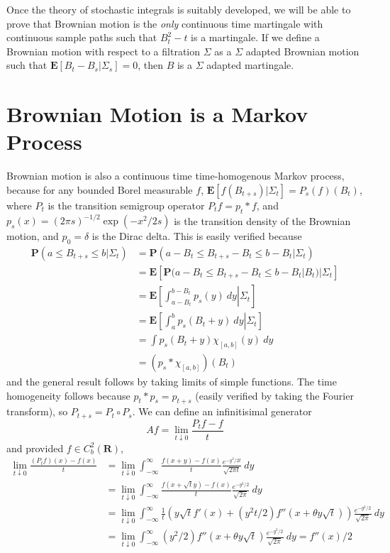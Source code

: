 Once the theory of stochastic integrals is suitably developed, we will be able to prove that Brownian motion is the {\it only} continuous time martingale with continuous sample paths such that $B_t^2 - t$ is a martingale. If we define a Brownian motion with respect to a filtration $\Sigma$ as a $\Sigma$ adapted Brownian motion such that $\mathbf{E}[B_t - B_s|\Sigma_s] = 0$, then $B$ is a $\Sigma$ adapted martingale.

\section{Brownian Motion is a Markov Process}

Brownian motion is also a continuous time time-homogenous Markov process, because for any bounded Borel measurable $f$, $\mathbf{E}[f(B_{t+s}) | \Sigma_t] = P_s(f)(B_t)$, where $P_t$ is the transition semigroup operator $P_t f = p_t * f$, and $p_s(x) = (2 \pi s)^{-1/2} \exp(-x^2/2s)$ is the transition density of the Brownian motion, and $p_0 = \delta$ is the Dirac delta. This is easily verified because
%
\begin{align*}
    \mathbf{P}(a \leq B_{t+s} \leq b | \Sigma_t) &= \mathbf{P}(a - B_t \leq B_{t+s} - B_t \leq b - B_t | \Sigma_t)\\
    &= \mathbf{E}[\mathbf{P}(a - B_t \leq B_{t+s} - B_t \leq b - B_t | B_t) | \Sigma_t]\\
    &= \mathbf{E} \left. \left[ \int_{a - B_t}^{b - B_t} p_s(y)\ dy \right| \Sigma_t \right]\\
    &= \mathbf{E} \left. \left[ \int_a^b p_s(B_t + y)\ dy \right| \Sigma_t \right]\\
    &= \int p_s(B_t + y) \chi_{[a,b]}(y)\ dy\\
    &= (p_s * \chi_{[a,b]})(B_t)
\end{align*}
%
and the general result follows by taking limits of simple functions. The time homogeneity follows because $p_t * p_s = p_{t+s}$ (easily verified by taking the Fourier transform), so $P_{t+s} = P_t \circ P_s$. We can define an infinitisimal generator
%
\[ Af = \lim_{t \downarrow 0} \frac{P_tf - f}{t} \]
%
and provided $f \in C_b^2(\mathbf{R})$,
%
\begin{align*}
    \lim_{t \downarrow 0} \frac{(P_tf)(x) - f(x)}{t} &= \lim_{t \downarrow 0} \int_{-\infty}^\infty \frac{f(x + y) - f(x)}{t} \frac{e^{-y^2/2t}}{\sqrt{2\pi t}}\ dy\\
    &= \lim_{t \downarrow 0} \int_{-\infty}^\infty \frac{f(x + \sqrt{t}y) - f(x)}{t} \frac{e^{-y^2/2}}{\sqrt{2\pi}}\ dy\\
    &= \lim_{t \downarrow 0} \int_{-\infty}^\infty \frac{1}{t} \left( y \sqrt{t} f'(x) + (y^2t/2) f''(x + \theta y \sqrt{t}) \right) \frac{e^{-y^2/2}}{\sqrt{2\pi}}\ dy\\
    &= \lim_{t \downarrow 0} \int_{-\infty}^\infty (y^2/2) f''(x + \theta y \sqrt{t}) \frac{e^{-y^2/2}}{\sqrt{2\pi}}\ dy = f''(x)/2
\end{align*}
